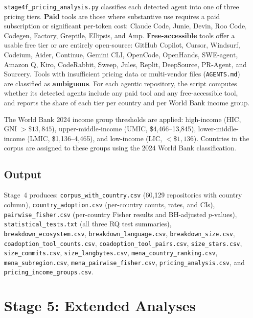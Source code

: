 \texttt{stage4f\_pricing\_analysis.py} classifies each detected agent into one of three pricing tiers. \textbf{Paid} tools are those where substantive use requires a paid subscription or significant per-token cost: Claude Code, Junie, Devin, Roo Code, Codegen, Factory, Greptile, Ellipsis, and Amp. \textbf{Free-accessible} tools offer a usable free tier or are entirely open-source: GitHub Copilot, Cursor, Windsurf, Codeium, Aider, Continue, Gemini CLI, OpenCode, OpenHands, SWE-agent, Amazon Q, Kiro, CodeRabbit, Sweep, Jules, Replit, DeepSource, PR-Agent, and Sourcery. Tools with insufficient pricing data or multi-vendor files (\texttt{AGENTS.md}) are classified as \textbf{ambiguous}. For each agentic repository, the script computes whether its detected agents include any paid tool and any free-accessible tool, and reports the share of each tier per country and per World Bank income group.

The World Bank 2024 income group thresholds are applied: high-income (HIC, GNI $> \$13,845$), upper-middle-income (UMIC, \$4,466--13,845), lower-middle-income (LMIC, \$1,136--4,465), and low-income (LIC, $< \$1,136$). Countries in the corpus are assigned to these groups using the 2024 World Bank classification.

\subsection{Output}

Stage~4 produces: \texttt{corpus\_with\_country.csv} (60,129 repositories with country column), \texttt{country\_adoption.csv} (per-country counts, rates, and CIs), \texttt{pairwise\_fisher.csv} (per-country Fisher results and BH-adjusted $p$-values), \texttt{statistical\_tests.txt} (all three RQ test summaries), \texttt{breakdown\_ecosystem.csv}, \texttt{breakdown\_language.csv}, \texttt{breakdown\_size.csv}, \texttt{coadoption\_tool\_counts.csv}, \texttt{coadoption\_tool\_pairs.csv}, \texttt{size\_stars.csv}, \texttt{size\_commits.csv}, \texttt{size\_langbytes.csv}, \texttt{mena\_country\_ranking.csv}, \texttt{mena\_subregion.csv}, \texttt{mena\_pairwise\_fisher.csv}, \texttt{pricing\_analysis.csv}, and \texttt{pricing\_income\_groups.csv}.

\section{Stage 5: Extended Analyses}
\label{sec:impl:extended}

